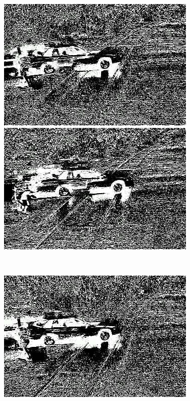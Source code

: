 \documentclass[a4paper]{ctexart}
\begin{document}
\begin{enumerate}[label=\arabic*、]
\begin{figure}[htbp]
\begin{minipage}[t]{0.2\textwidth}
		\end{minipage}
		\begin{minipage}[t]{0.2\textwidth}
			\centering
			\includegraphics[width=\textwidth]{figure/frames/avg9410.jpg}
		\end{minipage}
		\begin{minipage}[t]{0.2\textwidth}
			\centering
			\includegraphics[width=\textwidth]{figure/frames/avg9415.jpg}
		\end{minipage}\\
		\begin{minipage}[t]{0.2\textwidth}
			\centering
			\includegraphics[width=\textwidth]{figure/frames/avg19400.jpg}

\end{minipage}
\end{figure}
\end{enumerate}
\end{document}
